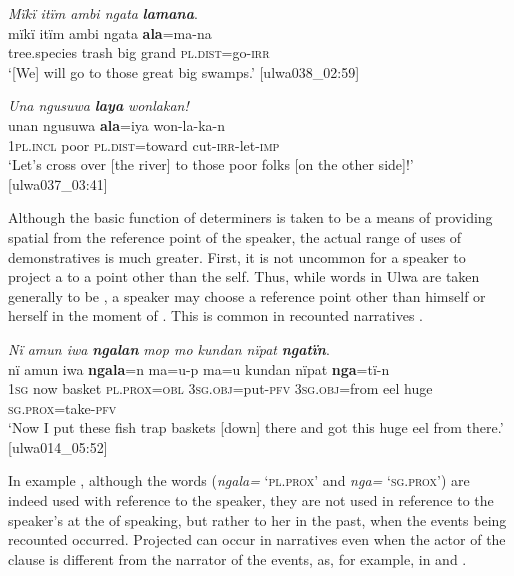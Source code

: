 \ea%
    \label{ex:det:96}
          \textit{Mïkï itïm ambi ngata} \textbf{\textit{lamana}}.\\
\gll mïkï  itïm  ambi  ngata  \textbf{ala}=ma-na\\
    tree.species  trash  big    grand  \textsc{pl.dist}=go-\textsc{irr}\\
\glt `[We] will go to those great big swamps.’ [ulwa038\_02:59]
\z

\ea%
    \label{ex:det:97}
          \textit{Una ngusuwa} \textbf{\textit{laya}} \textit{wonlakan!}\\
\gll    unan    ngusuwa  \textbf{ala}=iya      won-la-ka-n\\
    1\textsc{pl.incl}  poor    \textsc{pl.dist=}toward  cut-\textsc{irr-}let-\textsc{imp}\\
\glt `Let’s cross over [the river] to those poor folks [on the other side]!’ [ulwa037\_03:41]
\z

Although the basic function of  determiners is taken to be a means of providing spatial  from the reference point of the speaker, the actual range of uses of demonstratives is much greater. First, it is not uncommon for a speaker to project a  to a point other than the self. Thus, while  words in Ulwa are taken generally to be , a speaker may choose a reference point other than himself or herself in the moment of . This is common in recounted narratives .

\ea%
    \label{ex:det:98}
          \textit{Nï amun iwa} \textbf{\textit{ngalan}} \textit{mop mo kundan nïpat} \textbf{\textit{ngatïn}}.\\
\gll nï    amun  iwa      \textbf{ngala}=n    ma=u-p ma=u      kundan  nïpat  \textbf{nga}=tï-n\\
    1\textsc{sg}  now  basket  \textsc{pl.prox=obl}  3\textsc{sg.obj}=put-\textsc{pfv}    3\textsc{sg.obj}=from  eel    huge  \textsc{sg.prox}=take-\textsc{pfv}\\
\glt `Now I put these fish trap baskets [down] there and got this huge eel from there.’ [ulwa014\_05:52]
\z

In example , although the   words (\textit{ngala=} ‘\textsc{pl.prox}’ and \textit{nga=} ‘\textsc{sg.prox’}) are indeed used with reference to the speaker, they are not used in reference to the speaker’s  at the  of speaking, but rather to her  in the past, when the events being recounted occurred. Projected  can occur in narratives even when the actor of the clause is different from the narrator of the events, as, for example, in  and .

